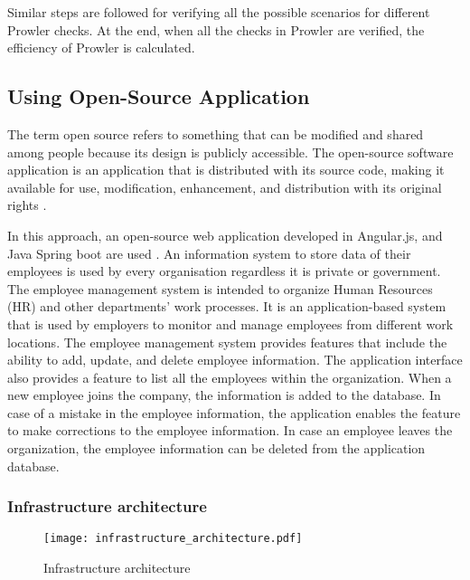 \par Similar steps are followed for verifying all the possible scenarios for different Prowler checks. At the end, when all the checks in Prowler are verified, the efficiency of Prowler is calculated.

\subsection{Using Open-Source Application}

\par The term open source refers to something that can be modified and shared among people because its design is publicly accessible.
The open-source software application is an application that is distributed with its source code, making it available
for use, modification, enhancement, and distribution with its original rights \cite{68}.

\par \par In this approach, an open-source web application developed in Angular.js, and Java Spring boot are used \cite{69}.
An information system to store data of their employees is used by every organisation regardless it is private or government.
The employee management system is intended to organize Human Resources (HR) and other departments' work processes.
It is an application-based system that is used by employers to monitor and manage employees from different work locations.
The employee management system provides features that include the ability to add, update, and delete employee information.
The application interface also provides a feature to list all the employees within the organization.
When a new employee joins the company, the information is added to the database.
In case of a mistake in the employee information, the application enables the feature to make corrections to the employee information.
In case an employee leaves the organization, the employee information can be deleted from the application database.

\subsubsection{Infrastructure architecture}

\begin{figure}
    \centering
    \texttt{[image: infrastructure\_architecture.pdf]}
    \caption{Infrastructure architecture}
    \label{fig:infrastructure_architecture}
\end{figure}

